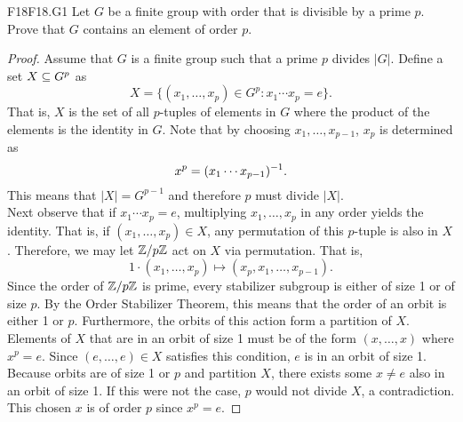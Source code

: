 \documentclass[../AlgebraQualSolutions.tex]{subfiles}
\begin{document}
	\begin{prob}{F18}{F18.G1}
	Let $G$ be a finite group with order that is divisible by a prime $p$. Prove that $G$ contains an element of order $p$.
	\end{prob}
	
	\begin{proof}
	Assume that $G$ is a finite group such that a prime $p$ divides $|G|$. Define a set $X \subseteq G^p$ as
		\[X = \{(x_1, \ldots, x_p) \in G^p: x_1 \cdots x_p = e\}. \]
	That is, $X$ is the set of all $p$-tuples of elements in $G$ where the product of the elements is the identity in $G$. Note that by choosing $x_1, \ldots, x_{p-1}$, $x_p$ is determined as
		\[x^p = (x_1 \cdots x_{p - 1})^{-1}. \]
	This means that $|X| = G^{p-1}$ and therefore $p$ must divide $|X|$.\\
	
	Next observe that if $x_1 \cdots x_p = e$, multiplying $x_1, \ldots, x_p$ in any order yields the identity. That is, if $(x_1, \ldots, x_p) \in X$, any permutation of this $p$-tuple is also in $X$. Therefore, we may let $\mathbb{Z} / p\mathbb{Z}$ act on $X$ via permutation. That is,
		\[1 \cdot (x_1, \ldots, x_p) \mapsto (x_p, x_1, \ldots, x_{p-1}). \]
	Since the order of $\mathbb{Z} / p\mathbb{Z}$ is prime, every stabilizer subgroup is either of size 1 or of size $p$. By the Order Stabilizer Theorem, this means that the order of an orbit is either 1 or $p$. Furthermore, the orbits of this action form a partition of $X$. Elements of $X$ that are in an orbit of size 1 must be of the form $(x, \ldots, x)$ where $x^p = e$. Since $(e, \ldots, e) \in X$ satisfies this condition, $e$ is in an orbit of size 1. Because orbits are of size 1 or $p$ and partition $X$, there exists some $x \neq e$ also in an orbit of size 1. If this were not the case, $p$ would not divide $X$, a contradiction. This chosen $x$ is of order $p$ since $x^p = e$.
	\end{proof}
	
\end{document}
